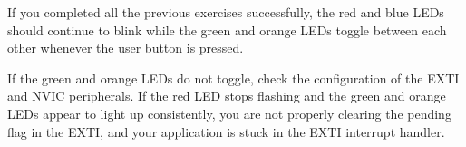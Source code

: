 \documentclass[11pt,fleqn]{book} %
\newcommand{\code}[3]{
    \begin{figure}[]
        \colorbox{gray!20!white}{
            \parbox{\linewidth-2\fboxsep} {
                \centering 
                
            }
        }
        \caption{#2}
        \label{#3}
    \end{figure}
}
\begin{document}
\begin{assignment}
    \noindent If you completed all the previous exercises successfully, the red and blue LEDs should continue to blink while the green and orange LEDs toggle between each other whenever the user button is pressed. 
    
    If the green and orange LEDs do not toggle, check the configuration of the EXTI and NVIC peripherals. If the red LED stops flashing and the green and orange LEDs appear to light up consistently, you are not properly clearing the pending flag in the EXTI, and your application is stuck in the EXTI interrupt handler.
    
\end{assignment}


%    
%    
%    
%    
\end{document}
